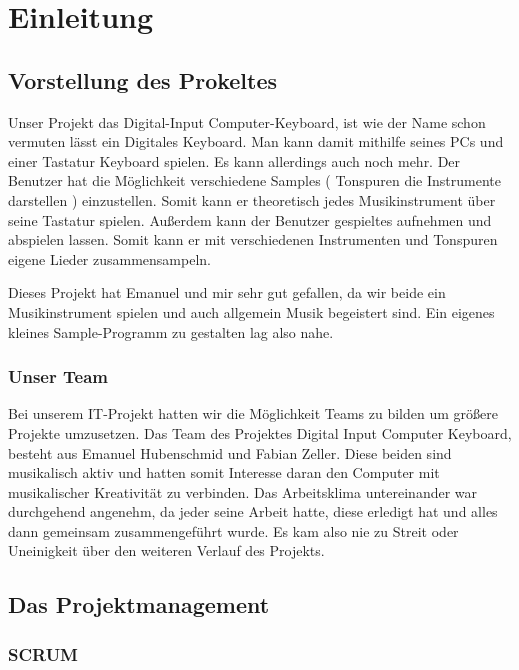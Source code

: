 \section{Einleitung}

\subsection{Vorstellung des Prokeltes}

Unser Projekt das Digital-Input Computer-Keyboard, ist wie der Name schon vermuten lässt ein 
Digitales Keyboard. Man kann damit mithilfe seines PCs und einer Tastatur Keyboard spielen. Es kann 
allerdings auch noch mehr. Der Benutzer hat die Möglichkeit verschiedene Samples ( Tonspuren die 
Instrumente darstellen ) einzustellen. Somit kann er theoretisch jedes Musikinstrument über seine 
Tastatur spielen. Außerdem kann der Benutzer gespieltes aufnehmen und abspielen lassen. Somit kann 
er mit verschiedenen Instrumenten und Tonspuren eigene Lieder zusammensampeln. 

Dieses Projekt hat Emanuel und mir sehr gut gefallen, da wir beide ein Musikinstrument spielen und 
auch allgemein Musik begeistert sind. Ein eigenes kleines Sample-Programm zu gestalten lag also 
nahe.


\subsubsection{Unser Team}

Bei unserem IT-Projekt hatten wir die Möglichkeit Teams zu bilden um größere Projekte umzusetzen. Das Team des Projektes Digital Input Computer Keyboard, besteht aus Emanuel Hubenschmid und Fabian Zeller. Diese beiden sind musikalisch aktiv und hatten somit Interesse daran den Computer mit musikalischer Kreativität zu verbinden. 
Das Arbeitsklima untereinander war durchgehend angenehm, da jeder seine Arbeit hatte, diese erledigt hat und alles dann gemeinsam zusammengeführt wurde. Es kam also nie zu Streit oder Uneinigkeit über den weiteren Verlauf des Projekts.

\newpage


\subsection{Das Projektmanagement}
\subsubsection{SCRUM}



